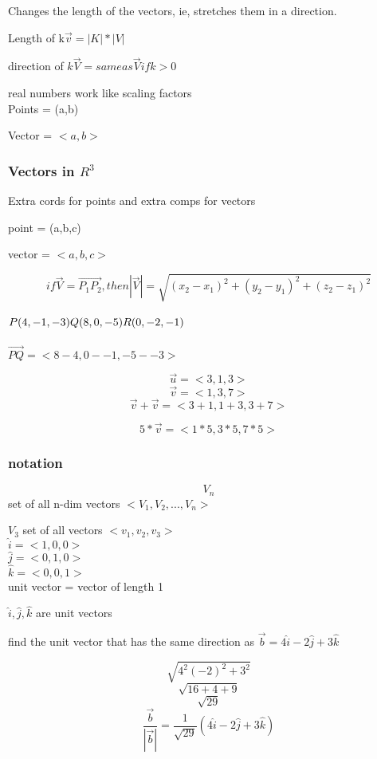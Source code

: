 \documentclass{article}
\begin{document}
Changes the length of the vectors, ie, stretches them in a direction. 

Length of k$\vec{v} =|K| * |V|$ 

direction of $k\vec{V} = same as \vec{V} if k > 0$

real numbers work like scaling factors \\

Points = (a,b)

Vector = $<a,b>$

\subsubsection{\textbf{Vectors in $R^3$}}

Extra cords for points and extra comps for vectors

point = (a,b,c)

vector = $<a,b,c>$

\[ if \vec{V} = \vec{P_1P_2}, then |\vec{V}| = \sqrt{(x_2 - x_1)^2 + (y_2 - y_1)^2 + (z_2 - z_1)^2}\]
\\
$P(4, -1, -3) \\
Q(8, 0 , -5) \\
R (0, -2, -1)$
\\
\\
$\vec{PQ} = <8-4, 0 --1, -5  --3>$

\[\vec{u} = <3, 1, 3>\]
\[\vec{v} = <1,3,7>\]
\[\vec{v} +\vec{v} = <3+1, 1+3, 3+7>\]

\[5 * \vec{v} = <1*5, 3*5, 7*5>\]

\subsubsection{notation}

\[V_n\] set of all n-dim vectors $<V_1, V_2, ..., V_n>$

$V_3$ set of all vectors $<v_1, v_2, v_3>$
\\ 
$\hat{i} = <1, 0, 0>$ \\
$\hat{j} = <0, 1, 0>$ \\
$\hat{k} = <0, 0, 1>$ \\

unit vector = vector of length 1

$\hat{i}, \hat{j}, \hat{k}$ are unit vectors

find the unit vector that has the same direction as $\vec{b} = 4\hat{i} -2\hat{j} +3\hat{k}$

\[\sqrt{4^2 (-2)^2 + 3^2}\]
\[\sqrt{16 +4 + 9 }\]
\[\sqrt{29}\]
\[\frac{\vec{b}}{|\vec{b}|} = \frac{1}{\sqrt{29}}(4\hat{i} -2\hat{j} +3\hat{k})\] \\
\end{document}
